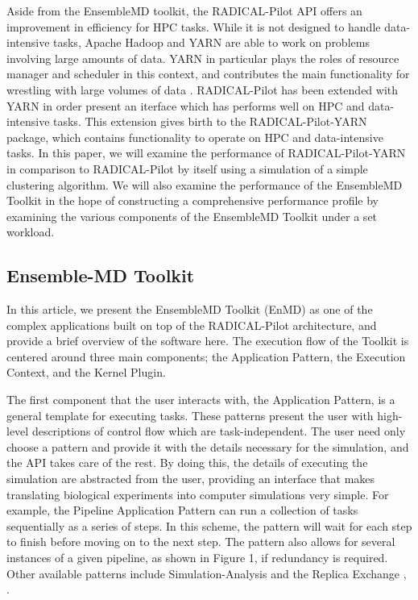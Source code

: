 \documentclass[]{article}
\begin{document}
		Aside from the EnsembleMD toolkit, the RADICAL-Pilot API offers an improvement in efficiency for HPC tasks. While it is not designed to handle data-intensive tasks, Apache Hadoop and YARN are able to work on problems involving large amounts of data. YARN in particular plays the roles of resource manager and scheduler in this context, and contributes the main functionality for wrestling with large volumes of data \cite{apache_hadoop_yarn}. RADICAL-Pilot has been extended with YARN in order present an iterface which has performs well on HPC and data-intensive tasks. This extension gives birth to the RADICAL-Pilot-YARN package, which contains functionality to operate on HPC and data-intensive tasks. In this paper, we will examine the performance of RADICAL-Pilot-YARN in comparison to RADICAL-Pilot by itself using a simulation of a simple clustering algorithm. We will also examine the performance of the EnsembleMD Toolkit in the hope of constructing a comprehensive performance profile by examining the various components of the EnsembleMD Toolkit under a set workload.

	\subsection{Ensemble-MD Toolkit} 
		In this article, we present the EnsembleMD Toolkit (EnMD) as one of the complex applications built on top of the RADICAL-Pilot architecture, and provide a brief overview of the software here. The execution flow of the Toolkit is centered around three main components; the Application Pattern, the Execution Context, and the Kernel Plugin. 


		The first component that the user interacts with, the Application Pattern, is a general template for executing tasks. These patterns present the user with high-level descriptions of control flow which are task-independent. The user need only choose a pattern and provide it with the details necessary for the simulation, and the API takes care of the rest. By doing this, the details of executing the simulation are abstracted from the user, providing an interface that makes translating biological experiments into computer simulations very simple. For example, the Pipeline Application Pattern can run a collection of tasks sequentially as a series of steps. In this scheme, the pattern will wait for each step to finish before moving on to the next step. The pattern also allows for several instances of a given pipeline, as shown in Figure 1, if redundancy is required. Other available patterns include Simulation-Analysis and the Replica Exchange \cite{enmd_paper}, \cite{repex_paper}.
\end{document}
